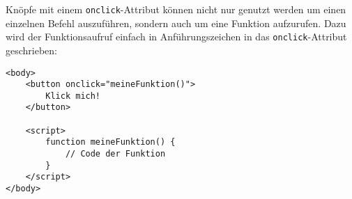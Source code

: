 \documentclass[a4paper,14pt]{extarticle}
\begin{document}

Knöpfe mit einem \texttt{onclick}-Attribut können nicht nur genutzt werden um einen einzelnen Befehl auszuführen, sondern auch um eine Funktion aufzurufen. Dazu wird der Funktionsaufruf einfach in Anführungszeichen in das \texttt{onclick}-Attribut geschrieben:

\begin{verbatim}
<body>
	<button onclick="meineFunktion()">
		Klick mich!
	</button>

	<script>
		function meineFunktion() {
			// Code der Funktion
		}
	</script>
</body>
\end{verbatim}

\end{document}
